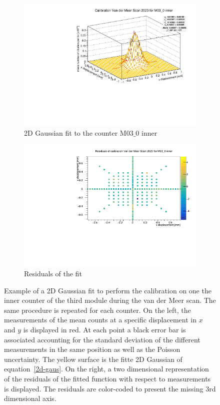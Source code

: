 \begin{figure}
    \centering
    \begin{subfigure}{0.48\textwidth}
    \includegraphics[width=\linewidth]{figures/M03_0.pdf}
    \caption{2D Gaussian fit to the counter M$03\_0$ inner}\label{fig:fit_M03}
    \end{subfigure}
    \begin{subfigure}{0.48\textwidth}
    \includegraphics[width=\linewidth]{figures/M03_0_res.pdf}
    \caption{Residuals of the fit}\label{fig:M03_res}
    \end{subfigure}
    \caption{Example of a 2D Gaussian fit to perform the calibration on one the inner counter of the third module during the van der Meer scan. The same procedure is repeated for each counter. On the left, the measurements of the mean counts at a specific displacement in $x$ and $y$ is displayed in red. At each point a black error bar is associated accounting for the standard deviation of the different measurements in the same position as well as the Poisson uncertainty. The yellow surface is the fitte 2D Gaussian of equation~\eqref{2d-gaus}. On the right, a two dimensional representation of the residuals of the fitted function with respect to measurements is displayed. The residuals are color-coded to present the missing 3rd dimensional axis.}
    \label{fig:fit_example}
\end{figure}


